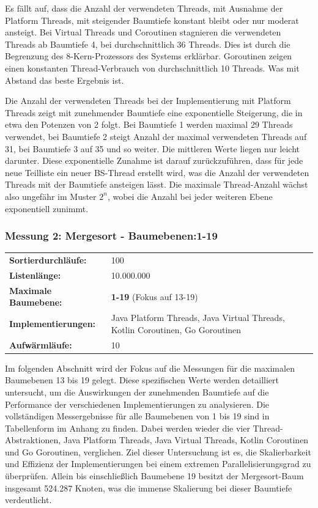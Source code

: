 \documentclass[fontsize=12pt,paper=a4,twoside=semi,parskip=half-,headsepline,headinclude]{scrreprt}
\begin{document}
Es fällt auf, dass die Anzahl der verwendeten Threads, mit Ausnahme der Platform Threads, mit steigender Baumtiefe konstant bleibt oder nur moderat ansteigt. Bei Virtual Threads und Coroutinen stagnieren die verwendeten Threads ab Baumtiefe 4, bei durchschnittlich 36 Threads. Dies ist durch die Begrenzung des 8-Kern-Prozessors des Systems erklärbar. Goroutinen zeigen einen konstanten Thread-Verbrauch von durchschnittlich 10 Threads. Was mit Abstand das beste Ergebnis ist. 

Die Anzahl der verwendeten Threads bei der Implementierung mit Platform Threads zeigt mit zunehmender Baumtiefe eine exponentielle Steigerung, die in etwa den Potenzen von 2 folgt. Bei Baumtiefe 1 werden maximal 29 Threads verwendet, bei Baumtiefe 2 steigt Anzahl der maximal verwendeten Threads auf 31, bei Baumtiefe 3 auf 35 und so weiter. Die mittleren Werte liegen nur leicht darunter. Diese exponentielle Zunahme ist darauf zurückzuführen, dass für jede neue Teilliste ein neuer BS-Thread erstellt wird, was die Anzahl der verwendeten Threads mit der Baumtiefe ansteigen lässt. Die maximale Thread-Anzahl wächst also ungefähr im Muster $2^n$, wobei die Anzahl bei jeder weiteren Ebene exponentiell zunimmt.


\subsubsection{Messung 2: Mergesort - Baumebenen:1-19}

\begin{tabularx}{\textwidth}{@{}lX@{}}
	\textbf{Sortierdurchläufe:} & 100 \\
	\textbf{Listenlänge:} & 10.000.000 \\
	\textbf{Maximale Baumebene:} & \textbf{1-19} (Fokus auf 13-19) \\
	\textbf{Implementierungen:} & Java Platform Threads, Java Virtual Threads, Kotlin Coroutinen, Go Goroutinen \\
	\textbf{Aufwärmläufe:} & 10
\end{tabularx}

Im folgenden Abschnitt wird der Fokus auf die Messungen für die maximalen Baum\-ebenen 13 bis 19 gelegt. Diese spezifischen Werte werden detailliert untersucht, um die Auswirkungen der zunehmenden Baumtiefe auf die Performance der verschiedenen Implementierungen zu analysieren. Die vollständigen Messergebnisse für alle  Baumebenen von 1 bis 19 sind in Tabellenform im Anhang zu finden. Dabei werden wieder die vier Thread-Abstraktionen, Java Platform Threads, Java Virtual Threads, Kotlin Coroutinen und Go Goroutinen, verglichen. Ziel dieser Untersuchung ist es, die Skalierbarkeit und Effizienz der Implementierungen bei einem extremen Parallelisierungsgrad zu überprüfen. Allein bis einschließlich Baumebene 19 besitzt der Mergesort-Baum insgesamt 524.287 Knoten, was die immense Skalierung bei dieser Baumtiefe verdeutlicht.
\end{document}
